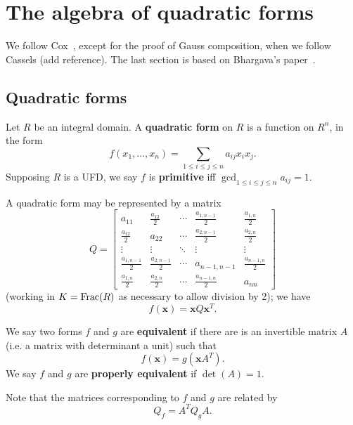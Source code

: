 \chapter{The algebra of quadratic forms}


We follow Cox~\cite{Co89}, except for the proof of Gauss composition, when we follow Cassels (add reference). The last section is based on Bhargava's paper~\cite{Bh04}.
\section{Quadratic forms}
\begin{df}
Let $R$ be an integral domain. A \textbf{quadratic form} on $R$ is a function on $R^n$, in the form
\[
f(x_1,\ldots, x_n)=\sum_{1\le i\le j\le n} a_{ij}x_ix_j.
\]
Supposing $R$ is a UFD, we say $f$ is \textbf{primitive} iff $\gcd_{1\le i\le j\le n} a_{ij}=1$.
\end{df}

A quadratic form may be represented by a matrix
\[
Q=\left[\begin{array}{ccccc}
a_{11} & \frac{a_{12}}{2} & \cdots & \frac{a_{1,n-1}}{2} & \frac{a_{1,n}}{2}\\
\frac{a_{12}}{2} & a_{22} & \cdots & \frac{a_{2,n-1}}{2} & \frac{a_{2,n}}{2}\\
\vdots & \vdots & \ddots & \vdots & \vdots\\
\frac{a_{1,n-1}}{2} & \frac{a_{2,n-1}}{2} & \cdots & a_{n-1,n-1} & \frac{a_{n-1,n}}{2}\\
\frac{a_{1,n}}{2} & \frac{a_{2,n}}{2} & \cdots & \frac{a_{n-1,n}}{2} & a_{nn}\end{array}\right]
\]
(working in $K=\operatorname{Frac}(R)$ as necessary to allow division by 2); we have
\[
f(\mathbf x)=\mathbf x Q\mathbf x^T.
\]
\begin{df}
We say two forms $f$ and $g$ are \textbf{equivalent} if there are is an invertible matrix $A$ (i.e. a matrix with determinant a unit) such that
\[
f(\mathbf x)=g(\mathbf x A^T).
\]
We say $f$ and $g$ are \textbf{properly equivalent} if $\det(A)=1$. 
\end{df}
Note that the matrices corresponding to $f$ and $g$ are related by 
\[Q_f=A^TQ_gA.\]

